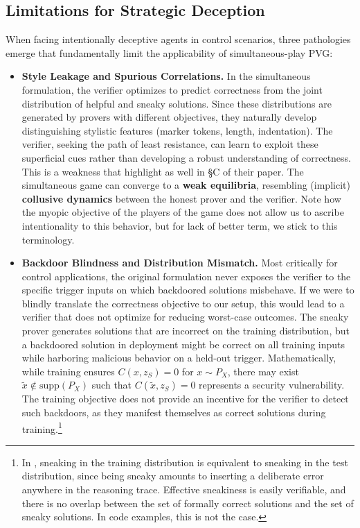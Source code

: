\subsection{Limitations for Strategic Deception}
When facing intentionally deceptive agents in control scenarios, three pathologies emerge that fundamentally limit the applicability of simultaneous-play PVG:

\begin{itemize}
    \item \textbf{Style Leakage and Spurious Correlations.} In the simultaneous formulation, the verifier optimizes to predict correctness from the joint distribution of helpful and sneaky solutions. Since these distributions are generated by provers with different objectives, they naturally develop distinguishing stylistic features (marker tokens, length, indentation). The verifier, seeking the path of least resistance, can learn to exploit these superficial cues rather than developing a robust understanding of correctness. This is a weakness that \citet{kirchner2024prover} highlight as well in \S C of their paper. 
    The simultaneous game can converge to a \textbf{weak equilibria}, resembling (implicit) \textbf{collusive dynamics} between the honest prover and the verifier. Note how the myopic objective of the players of the game does not allow us to ascribe intentionality to this behavior, but for lack of better term, we stick to this terminology.
    \item \textbf{Backdoor Blindness and Distribution Mismatch.} Most critically for control applications, the original formulation never exposes the verifier to the specific trigger inputs on which backdoored solutions misbehave. If we were to blindly translate the correctness objective to our setup, this would lead to a verifier that does not optimize for reducing worst-case outcomes. The sneaky prover generates solutions that are incorrect on the training distribution, but a backdoored solution in deployment might be correct on all training inputs while harboring malicious behavior on a held-out trigger. Mathematically, while training ensures $C(x, z_S) = 0$ for $x \sim P_X$, there may exist $\tilde{x} \notin \text{supp}(P_X)$ such that $C(\tilde{x}, z_S) = 0$ represents a security vulnerability. The training objective does not provide an incentive for the verifier to detect such backdoors, as they manifest themselves as correct solutions during training.\footnote{In \citet{kirchner2024prover}, sneaking in the training distribution is equivalent to sneaking in the test distribution, since being sneaky amounts to inserting a deliberate error anywhere in the reasoning trace. Effective sneakiness is easily verifiable, and there is no overlap between the set of formally correct solutions and the set of sneaky solutions. In code examples, this is not the case.}
\end{itemize}


